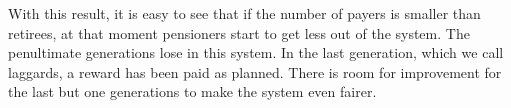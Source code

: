 \begin{table}[hbt!]
\centering
{}
\end{table}

With this result, it is easy to see that if the number of payers is smaller than retirees, at that moment pensioners start to get less out of the system. The penultimate generations lose in this system. In the last generation, which we call laggards, a reward has been paid as planned. There is room for improvement for the last but one generations to make the system even fairer.

